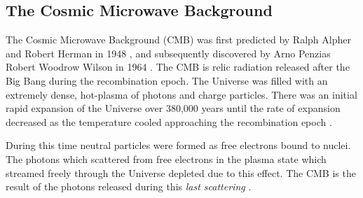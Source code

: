 \subsection{The Cosmic Microwave Background}\label{sec:DMOverview/CMB}
The Cosmic Microwave Background (CMB) was first predicted by Ralph Alpher and Robert Herman in 1948 \cite{CMBprediction}, and subsequently discovered by Arno Penzias Robert Woodrow Wilson in 1964 \cite{CMBDisco}. The CMB is relic radiation released after the Big Bang during the recombination epoch. The Universe was filled with an extremely dense, hot-plasma of photons and charge particles. There was an initial rapid expansion of the Universe over 380,000 years until the rate of expansion decreased as the temperature cooled approaching the recombination epoch \cite{DMPrimer}. 

During this time neutral particles were formed as free electrons bound to nuclei. The photons which scattered from free electrons in the plasma state which streamed freely through the Universe depleted due to this effect. The CMB is the result of the photons released during this \textit{last scattering} \cite{Cirelli:2024ssz}.

